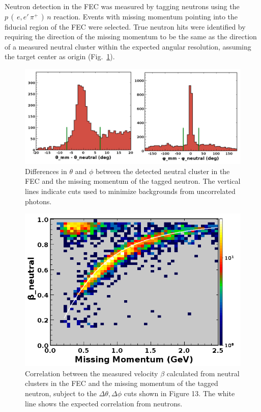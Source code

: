Neutron detection in the FEC was measured by tagging neutrons using the $p\,(\,e,e'\,\pi^+\,)\,n$ reaction. Events with missing momentum pointing into the fiducial region of the FEC were selected.  True neutron hits were identified by requiring the direction of the missing momentum to be the same as the direction of a measured neutral cluster within the expected angular resolution, assuming the target center
as origin (Fig.~\ref{fig:S10_4_1}).  

\begin{figure}[hbt]
\centering
\includegraphics[width=1.0\columnwidth,keepaspectratio]{img/S10_4_1.png}
\caption[]{Differences in $\theta$ and $\phi$ between the detected neutral cluster in the FEC and the missing momentum of the tagged neutron.  The vertical lines indicate cuts used to minimize backgrounds from uncorrelated photons.}
\label{fig:S10_4_1}
\end{figure}

\begin{figure}[hbt]
\centering
\includegraphics[width=1.0\columnwidth,keepaspectratio]{img/S10_4_2.png}
\caption[]{Correlation between the measured velocity $\beta$ calculated from neutral clusters in the FEC and the missing momentum of the tagged neutron, subject to the $\Delta\theta,\Delta\phi$ cuts shown in Figure 13.  The white line shows the expected correlation from neutrons.}
\label{fig:S10_4_2}
\end{figure}






